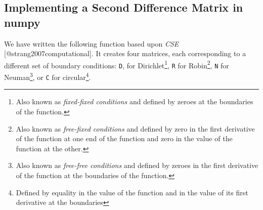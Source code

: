 \documentclass[12pt,]{book}
\begin{document}
\vfill

\pagebreak

\subsection{Implementing a Second Difference Matrix in
numpy}\label{implementing-a-second-difference-matrix-in-numpy}

We have written the following function based upon \emph{CSE}
{[}@strang2007computational{]}. It creates four matrices, each
corresponding to a different set of boundary conditions: \texttt{D}, for
Dirichlet\footnote{Also known as \emph{fixed-fixed conditions} and defined by zeroes at the boundaries of the function.},
\texttt{R} for
Robin\footnote{Also known as \emph{free-fixed conditions} and defined by zero in the first derivative of the function at one end of the function and zero in the value of the function at the other.},
\texttt{N} for
Neuman\footnote{Also known as \emph{free-free conditions} and defined by zeroes in the first derivative of the function at the boundaries of the function.},
or \texttt{C} for
circular\footnote{Defined by equality in the value of the function and in the value of its first derivative at the boundaries}.
\end{document}
